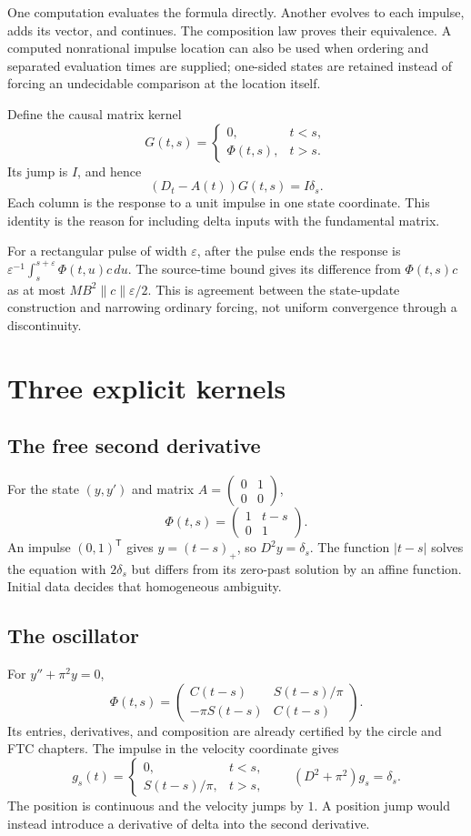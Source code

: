 One computation evaluates the formula directly.  Another evolves to each
impulse, adds its vector, and continues.  The composition law proves their
equivalence.  A computed nonrational impulse location can also be used
when ordering and separated evaluation times are supplied; one-sided
states are retained instead of forcing an undecidable comparison at the
location itself.

Define the causal matrix kernel
\[
 G(t,s)=\begin{cases}0,&t<s,\\\Phi(t,s),&t>s.\end{cases}
\]
Its jump is $I$, and hence
\[
 \boxed{(D_t-A(t))G(t,s)=I\delta_s.}
\]
Each column is the response to a unit impulse in one state coordinate.
This identity is the reason for including delta inputs with the fundamental
matrix.

For a rectangular pulse of width $\varepsilon$, after the pulse ends the
response is $\varepsilon^{-1}\int_s^{s+\varepsilon}\Phi(t,u)c\,du$.
The source-time bound gives its difference from $\Phi(t,s)c$ as at most
$MB^2\|c\|\varepsilon/2$.  This is agreement between the state-update
construction and narrowing ordinary forcing, not uniform convergence
through a discontinuity.

\section{Three explicit kernels}
\subsection{The free second derivative}
For the state $(y,y')$ and matrix
$A=\left(\begin{smallmatrix}0&1\\0&0\end{smallmatrix}\right)$,
\[
 \Phi(t,s)=\begin{pmatrix}1&t-s\\0&1\end{pmatrix}.
\]
An impulse $(0,1)^{\mathsf T}$ gives $y=(t-s)_+$, so $D^2y=\delta_s$.
The function $|t-s|$ solves the equation with $2\delta_s$ but differs
from its zero-past solution by an affine function.  Initial data decides
that homogeneous ambiguity.

\subsection{The oscillator}
For $y''+\pi^2y=0$,
\[
 \Phi(t,s)=
 \begin{pmatrix}
 C(t-s)&S(t-s)/\pi\\
 -\pi S(t-s)&C(t-s)
 \end{pmatrix}.
\]
Its entries, derivatives, and composition are already certified by the
circle and FTC chapters.  The impulse in the velocity coordinate gives
\[
 g_s(t)=\begin{cases}0,&t<s,\\S(t-s)/\pi,&t>s,\end{cases}
 \qquad (D^2+\pi^2)g_s=\delta_s.
\]
The position is continuous and the velocity jumps by $1$.  A position jump
would instead introduce a derivative of delta into the second derivative.

